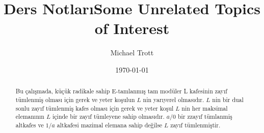 \documentclass[a4paper,12pt]{article}
\title{Ders Notları}
\date{}
\numberwithin{equation}{section}
\theoremstyle{italik}
\begin{document}
\abovedisplayshortskip=0pt
\belowdisplayshortskip=0pt
\belowdisplayskip=0pt
\abovedisplayskip=0pt


\title{Some Unrelated Topics of Interest}
\author{Michael Trott}
\date{\today}
\maketitle
\begin{abstract}
Bu çalışmada, küçük radikale sahip E-tamlanmış tam modüler L kafesinin zayıf tümlenmiş olması için gerek ve yeter koşulun 
$L$ nin yarıyerel olmasıdır. $L$ nin bir dual sonlu zayıf tümlenmiş kafes olması için gerek ve yeter koşul $L$ nin her maksimal elemanının 
$L$ içinde bir zayıf tümleyene sahip olmasıdır. $ a/0 $ bir zzayıf tümlanmiş altkafes ve $ 1/a $ altkafesi mazimal elemana sahip değilse
$L$ zayıf tümlenmiştir.
\end{abstract}
\end{document}
